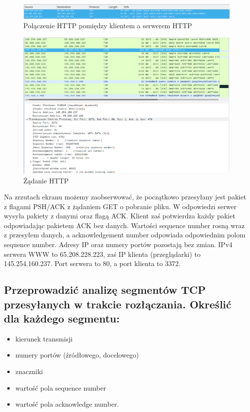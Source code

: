 \documentclass[polish, a4paper]{article}
\begin{document}
\begin{figure}[H]
\centering
\includegraphics[width=\textwidth]{polaczenie.png}
\caption{Połączenie HTTP pomiędzy klientem a serwerem HTTP}
\end{figure}

\begin{figure}[H]
\centering
\includegraphics[width=\textwidth]{HTTP.png}
\caption{Żądanie HTTP}
\end{figure}

Na zrzutach ekranu możemy zaobserwować, że początkowo przesyłany jest pakiet z flagami PSH/ACK z żądaniem GET o pobranie pliku. W odpowiedzi serwer wysyła pakiety z danymi oraz flagą ACK. Klient zaś potwierdza każdy pakiet odpowiadając pakietem ACK bez danych. Wartości sequence number rosną wraz z przesyłem danych, a acknowledgement number odpowiada odpowiednim polom sequence number. Adresy IP oraz numery portów pozostają bez zmian. IPv4 serwera WWW to 65.208.228.223, zaś IP klienta (przeglądarki) to 145.254.160.237. Port serwera to 80, a port klienta to 3372.

\subsection{
Przeprowadzić analizę segmentów TCP przesyłanych w trakcie rozłączania. Określić dla
każdego segmentu:
}
\begin{itemize}
\item{kierunek transmisji}
\item{numery portów (źródłowego, docelowego)}
\item{znaczniki}
\item{wartość pola sequence number}
\item{wartość pola acknowledge number.}
\end{itemize}
\end{document}
